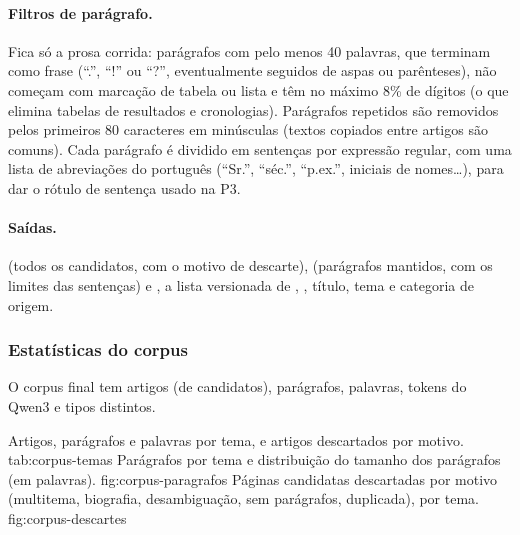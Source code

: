 \paragraph{Filtros de parágrafo.} Fica só a prosa corrida: parágrafos com pelo menos 40
palavras, que terminam como frase (``.'', ``!'' ou ``?'', eventualmente seguidos de aspas ou
parênteses), não começam com marcação de tabela ou lista e têm no máximo 8\% de dígitos
(o que elimina tabelas de resultados e cronologias). Parágrafos repetidos são removidos pelos
primeiros 80 caracteres em minúsculas (textos copiados entre artigos são comuns). Cada
parágrafo é dividido em sentenças por expressão regular, com uma lista de abreviações do
português (``Sr.'', ``séc.'', ``p.ex.'', iniciais de nomes\ldots), para dar o rótulo de
sentença usado na P3.

\paragraph{Saídas.}  (todos os candidatos, com o motivo de
descarte),  (parágrafos mantidos, com os limites das
sentenças) e , a lista versionada de ,
, título, tema e categoria de origem.

\subsubsection*{Estatísticas do corpus}

O corpus final tem \nArtigos{} artigos (de \nArtigosCandidatos{} candidatos), \nParagrafos{}
parágrafos, \nPalavrasCorpus{} palavras, \nTokensCorpus{} tokens do Qwen3 e \nTiposCorpus{}
tipos distintos.

    {Artigos, parágrafos e palavras por tema, e artigos descartados por motivo.}
    {tab:corpus-temas}
    {Parágrafos por tema e distribuição do tamanho dos parágrafos (em palavras).}
    {fig:corpus-paragrafos}
    {Páginas candidatas descartadas por motivo (multitema, biografia, desambiguação, sem
    parágrafos, duplicada), por tema.}
    {fig:corpus-descartes}

